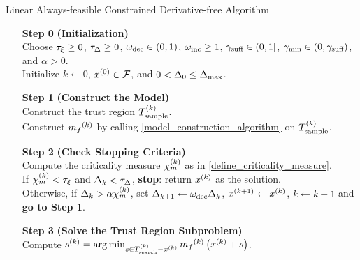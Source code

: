 \documentclass{article}
\begin{document}
{
\begin{fullwidth}[leftmargin=0in, rightmargin=0in, width=\linewidth-0.5in]
\begin{flushleft}

\begin{algorithm}[H]
    \caption{Linear Always-feasible Constrained Derivative-free Algorithm}
    \label{linearly_constrained_dfo_simple}
    \begin{itemize}
        \item[\textbf{Step 0}] \textbf{(Initialization)} \\
            Choose
            $\tau_{\xi}\ge 0$,
            $\tau_{\Delta} \ge 0$, 
            $\omega_{\text{dec}} \in (0,1)$, 
            $\omega_{\text{inc}} \ge 1$,  
            $ \gamma_{\textrm{suff}} \in (0,1]$, 
            $\gamma_{\textrm{min}} \in (0,\gamma_{\textrm{suff}})$,
			and $\alpha > 0$. \\
            Initialize
            $k\gets 0$,
            $x^{(0)} \in {\mathcal F}$,
            and $0 < \Delta_0 \le {\Delta_{\textrm{max}}}$.
            
        \item[\textbf{Step 1}] \textbf{(Construct the Model)} \\
           Construct the trust region ${T_{\text{sample}}^{(k)}}$. \\
           Construct ${{m}_f}^{(k)}$ by calling \cref{model_construction_algorithm} on ${T_{\text{sample}}^{(k)}}$.
        
        \item[\textbf{Step 2}] \textbf{(Check Stopping Criteria)} \\
            Compute the criticality measure ${\chi_m^{(k)}}$ as in \cref{define_criticality_measure}. \\
            If $ {\chi_m^{(k)}} < \tau_{\xi} $ and $\Delta_k <\tau_{\Delta}$,  {\bf stop}: return $x^{(k)}$ as the solution.   \\
            Otherwise, if $\Delta_k > \alpha {\chi_m^{(k)}}$,   
            set 
                $\Delta_{k+1} \gets \omega_{\text{dec}}\Delta_k$, 
                ${{x}^{(k+1)}} \gets x^{(k)}$,
                $k \gets k+1$ and {\bf go to Step 1}.
           
        
        \item[\textbf{Step 3}] \textbf{(Solve the Trust Region Subproblem)} \\
            Compute ${{s}^{(k)}} = \operatorname*{arg\,min}_{s \in {T_{\text{search}}^{(k)}} - x^{(k)}} {{m}_f}^{(k)}\left(x^{(k)} + s\right)$. 
            

\end{itemize}
\end{algorithm}
\end{flushleft}
\end{fullwidth}}
\end{document}
